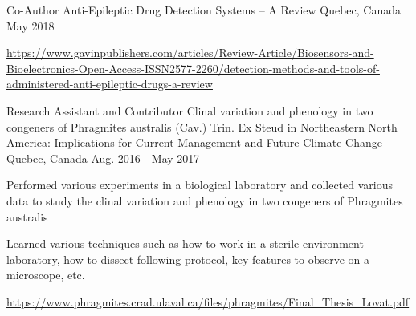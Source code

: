 \begin{cventries}
  \cventry
    {Co-Author}
    {Anti-Epileptic Drug Detection Systems – A Review}
    {Quebec, Canada}
    {May 2018}
    {
      \begin{cvitems}
        \item{\url{https://www.gavinpublishers.com/articles/Review-Article/Biosensors-and-Bioelectronics-Open-Access-ISSN2577-2260/detection-methods-and-tools-of-administered-anti-epileptic-drugs-a-review}}
      \end{cvitems}
    }    \newline

        \cventry
    {Research Assistant
and Contributor}
    {Clinal variation and phenology in two congeners of Phragmites australis (Cav.) Trin. Ex Steud in Northeastern North America: Implications for Current Management and Future Climate Change}
    {Quebec, Canada}
    {Aug. 2016 - May 2017}
    {
      \begin{cvitems}
        \item {Performed various experiments in a biological laboratory and collected various data to study the clinal variation and phenology in two congeners of Phragmites australis}
        \item {Learned various techniques such as how to work in a sterile environment laboratory, how to dissect following protocol, key features to observe on a microscope, etc. }
        \item{\url{https://www.phragmites.crad.ulaval.ca/files/phragmites/Final_Thesis_Lovat.pdf}}
      \end{cvitems}
    }

\end{cventries}
